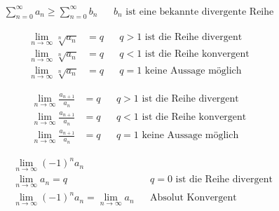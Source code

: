 \begin{boxleft}
\end{boxleft}\begin{boxrightshaded}
\begin{align*}
\sum_{n=0}^\infty a_n\geq\sum_{n=0}^\infty b_n&&\text{$b_n$ ist eine bekannte divergente Reihe}
\end{align*}
\end{boxrightshaded}

\begin{boxleft}
\end{boxleft}\begin{boxrightshaded}
\begin{align*}
\lim_{n\to\infty}\sqrt[n]{a_n}&=q&&\text{$q>1$ ist die Reihe divergent}\\
\lim_{n\to\infty}\sqrt[n]{a_n}&=q&&\text{$q<1$ ist die Reihe konvergent}\\
\lim_{n\to\infty}\sqrt[n]{a_n}&=q&&\text{$q=1$ keine Aussage möglich}
\end{align*}
\end{boxrightshaded}

\begin{boxleft}
\end{boxleft}\begin{boxrightshaded}
\begin{align*}
\lim_{n\to\infty}\frac{a_{n+1}}{a_n}&=q&&\text{$q>1$ ist die Reihe divergent}\\
\lim_{n\to\infty}\frac{a_{n+1}}{a_n}&=q&&\text{$q<1$ ist die Reihe konvergent}\\
\lim_{n\to\infty}\frac{a_{n+1}}{a_n}&=q&&\text{$q=1$ keine Aussage möglich}
\end{align*}
\end{boxrightshaded}

\begin{boxleft}
\end{boxleft}\begin{boxrightshaded}
\begin{align*}
&\lim_{n\to\infty}\left(-1\right)^n a_n\\
&\lim_{n\to\infty}a_n=q&&\text{$q=0$ ist die Reihe divergent}\\
&\lim_{n\to\infty}\left(-1\right)^n a_n=\lim_{n\to\infty} a_n&&\text{Absolut Konvergent}\\
\end{align*}
\end{boxrightshaded}

